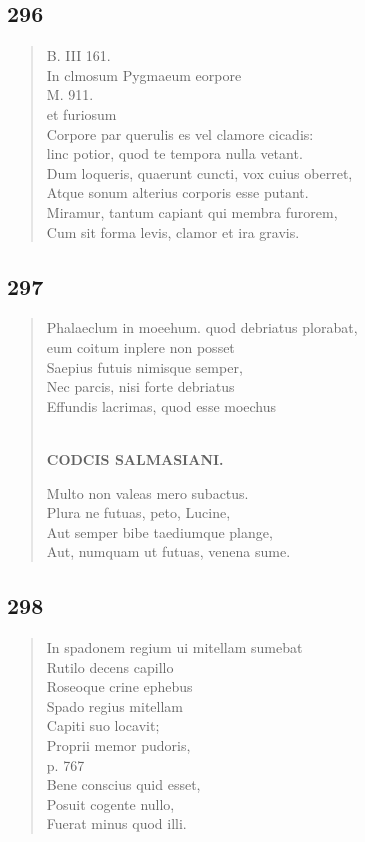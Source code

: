 \documentclass[11pt, a4paper]{report}
\begin{document}
            \subsection*{296}
      \begin{verse}
      B. III 161. \\ In clmosum Pygmaeum eorpore \\ M. 911. \\ et furiosum \\ Corpore par querulis es vel clamore cicadis: \\ linc potior, quod te tempora nulla vetant. \\ Dum loqueris, quaerunt cuncti, vox cuius oberret, \\ Atque sonum alterius corporis esse putant. \\ Miramur, tantum capiant qui membra furorem, \\ Cum sit forma levis, clamor et ira gravis. \\ 
      \end{verse}
  
            \subsection*{297}
      \begin{verse}
      Phalaeclum in moeehum. quod debriatus plorabat, \\ eum coitum inplere non posset \\ Saepius futuis nimisque semper, \\ Nec parcis, nisi forte debriatus \\ Effundis lacrimas, quod esse moechus \\ 
        ﻿\pagebreak 
    \begin{center} \textbf{CODCIS SALMASIANI.} \end{center}Multo non valeas mero subactus. \\ Plura ne futuas, peto, Lucine, \\ Aut semper bibe taediumque plange, \\ Aut, numquam ut futuas, venena sume. \\ 
      \end{verse}
  
            \subsection*{298}
      \begin{verse}
      In spadonem regium ui mitellam sumebat \\ Rutilo decens capillo \\ Roseoque crine ephebus \\ Spado regius mitellam \\ Capiti suo locavit; \\ Proprii memor pudoris, \\ p. 767 \\ Bene conscius quid esset, \\ Posuit cogente nullo, \\ Fuerat minus quod illi. \\ 
      \end{verse}
  
\end{document}
